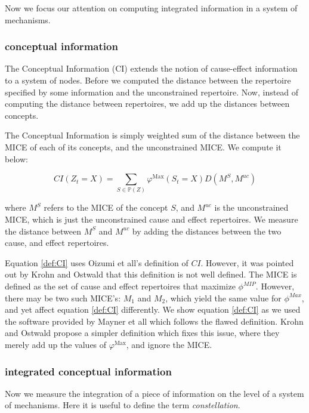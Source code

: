 Now we focus our attention on computing integrated information in a system of mechanisms. 

\subsubsection{conceptual information}
\label{sec:CI}
The Conceptual Information (CI) extends the notion of cause-effect information to a system of nodes. Before we computed the distance between the repertoire specified by some information and the unconstrained repertoire. Now, instead of computing the distance between repertoires, we add up the distances between concepts.

The Conceptual Information is simply weighted sum of the distance between the MICE of each of its concepts, and the unconstrained MICE. We compute it below:

\begin{equation}
\label{def:CI}
CI(Z_t = X) = \sum \limits_{S \in \mathbb{P}(Z)} \varphi^{\text{Max}}(S_t=X) D(M^S, M^{uc})
\end{equation}

where $M^S$ refers to the MICE of the concept $S$, and $M^{uc}$ is the unconstrained MICE, which is just the unconstrained cause and effect repertoires. We measure the distance between $M^S$ and $M^{uc}$ by adding the distances between the two cause, and effect repertoires.

\begin{remark}
	Equation \ref{def:CI} uses Oizumi et all's \cite{oizumi2014phenomenology} definition of $CI$. However, it was pointed out by Krohn and Ostwald \cite{krohn2016computing} that this definition is not well defined. The MICE is defined as the set of cause and effect repertoires that maximize $\phi^{MIP}$. However, there may be two such MICE's: $M_1$ and $M_2$, which yield the same value for $\phi^{Max}$, and yet affect equation \ref{def:CI} differently. We show equation \ref{def:CI} as we used the software provided by Mayner et all \cite{pyphi} which follows the flawed definition. Krohn and Ostwald propose a simpler definition which fixes this issue, where they merely add up the values of $\varphi^{\text{Max}}$, and ignore the MICE.
\end{remark}

\subsubsection{integrated conceptual information}
Now we measure the integration of a piece of information on the level of a system of mechanisms. Here it is useful to define the term \textit{constellation}.

